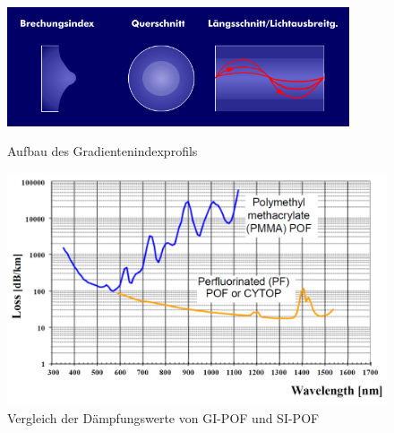 \begin{figure}[h]
    \begin{center}
        \begin{minipage}[t]{0.4\textwidth}
            \begin{center}
                \includegraphics[width=0.9\textwidth]{Bilder/Optische_Wellenleiter_Die_Polymer_Optische_Faser/Brechzahlprofile/pofgi.png}
                \caption[Aufbau des Gradientenindexprofils \newline \url{http://www.itwissen.info/bilder/aufbau-und-brechungsprofil-der-gradientenfaser.png}]{Aufbau des Gradientenindexprofils}
                \label{fig:pofgi}
            \end{center}
        \end{minipage}
        \hspace{0.025\textwidth}
        \begin{minipage}[t]{0.4\textwidth}
            \begin{center}
                \includegraphics[height=0.1\textheight]{Bilder/Optische_Wellenleiter_Die_Polymer_Optische_Faser/Brechzahlprofile/pofgidaempfung.png}
                \caption[Dämpfung bei einer GI-POF \newline \url{http://www.pofac.fh-nuernberg.de/pofac/de/was_sind_pof/images/gradientenindex_daempfung.png}]{Vergleich der Dämpfungswerte von GI-POF und SI-POF}
                \label{fig:pofgidaempfung}
            \end{center}
        \end{minipage}
    \end{center}
\end{figure}
